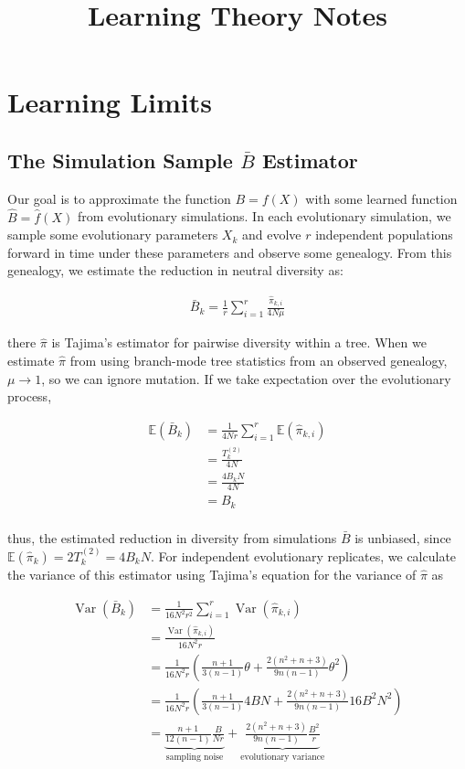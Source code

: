 \documentclass[11pt]{article}
\title{Learning Theory Notes}
\newcommand{\E}{\mathbb{E}}
\DeclareMathOperator{\var}{Var}
\begin{document}
\maketitle

\section*{Learning Limits}

\subsection*{The Simulation Sample $\bar{B}$ Estimator}

Our goal is to approximate the function $B = f(X)$ with some learned function
$\widehat{B} = \hat{f}(X)$ from evolutionary simulations. In each evolutionary
simulation, we sample some evolutionary parameters $X_k$ and evolve $r$
independent populations forward in time under these parameters and observe some
genealogy. From this genealogy, we estimate the reduction in neutral diversity
as:

\begin{align}
  \bar{B}_k = \frac{1}{r} \sum_{i=1}^r \frac{\hat{\pi}_{k,i}}{4N\mu}
\end{align}

there $\hat{\pi}$ is Tajima's estimator for pairwise diversity within a tree.
When we estimate $\hat{\pi}$ from using branch-mode tree statistics from an
observed genealogy, $\mu \to 1$, so we can ignore mutation.  If we take
expectation over the evolutionary process,

\begin{align}
  \E(\bar{B}_k) &= \frac{1}{4Nr} \sum_{i=1}^r \E(\hat{\pi}_{k,i}) \\
                &= \frac{T_k^{(2)}}{4N}  \\
                &= \frac{4B_kN}{4N}  \\
                &= B_k  \\
\end{align}

thus, the estimated reduction in diversity from simulations $\bar{B}$ is
unbiased, since $\E(\hat{\pi}_k) = 2T_k^{(2)} = 4B_k N$. For independent
evolutionary replicates, we calculate the variance of this estimator using
Tajima's equation for the variance of $\hat{\pi}$ as  

\begin{align}
  \var(\bar{B}_k) &= \frac{1}{16 N^2 r^2} \sum_{i=1}^r \var(\hat{\pi}_{k,i}) \\
                  &= \frac{\var(\hat{\pi}_{k,i})}{16 N^2 r} \\
                  &= \frac{1}{16N^2 r} \left( \frac{n + 1}{3(n-1)}\theta  + \frac{2(n^2 + n + 3)}{9n(n-1)}\theta^2 \right) \\
                  &= \frac{1}{16N^2 r} \left( \frac{n + 1}{3(n-1)} 4BN + \frac{2(n^2 + n + 3)}{9n(n-1)} 16B^2N^2 \right) \\
                  &= \underbrace{\frac{n + 1}{12(n-1)} \frac{B}{N r}}_\text{sampling noise} + \underbrace{\frac{2(n^2 + n + 3)}{9n(n-1)} \frac{B^2}{r}}_\text{evolutionary variance}
\end{align}
\end{document}
